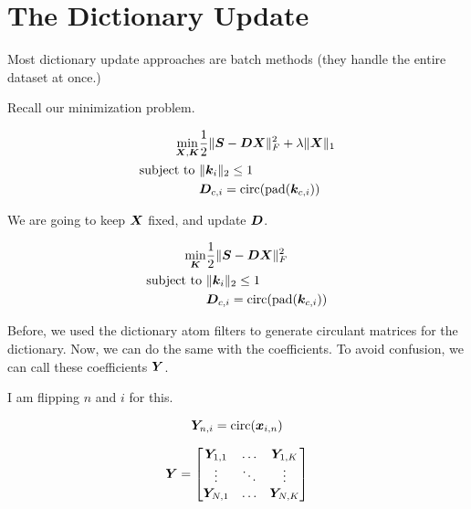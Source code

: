 \documentclass{article}
\begin{document}
\section{The Dictionary Update}

Most dictionary update approaches are batch methods (they handle the entire dataset at once.)


Recall our minimization problem.

\begin{equation}
\begin{aligned}
\min_{\bm{X},\bm{K}} & \frac{1}{2}\|\bm{S} - \bm{D}\bm{X}\|_F^2 + \lambda\|\bm{X}\|_1\\
\text{subject to } & \|\bm{k}_i\|_2 \leq 1\\
                   & \bm{D}_{c,i} = \operatorname{circ}(\operatorname{pad}(\bm{k}_{c,i}))
\end{aligned}
\end{equation}

We are going to keep $\bm{X}$ fixed, and update $\bm{D}$.

\begin{equation}
\begin{aligned}
\min_{\bm{K}} & \frac{1}{2}\|\bm{S} - \bm{D}\bm{X}\|_F^2\\
\text{subject to } & \|\bm{k}_i\|_2 \leq 1\\
                   & \bm{D}_{c,i} = \operatorname{circ}(\operatorname{pad}(\bm{k}_{c,i}))
\end{aligned}
\end{equation}

Before, we used the dictionary atom filters to generate circulant matrices for the dictionary. Now, we can do the same with the coefficients. To avoid confusion, we can call these coefficients $\bm{Y}$.

I am flipping $n$ and $i$ for this.

\begin{equation}
\bm{Y}_{n,i} = \operatorname{circ}(\bm{x}_{i,n})
\end{equation}


\begin{equation}
\begin{aligned}
\bm{Y} = \begin{bmatrix} \bm{Y}_{1,1} & \hdots & \bm{Y}_{1, K}\\
                      \vdots & \ddots & \vdots \\
                      \bm{Y}_{N,1} & \hdots & \bm{Y}_{N,K}
      \end{bmatrix}
\end{aligned}
\end{equation}
\end{document}
